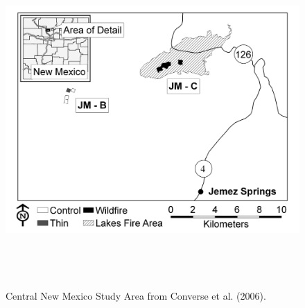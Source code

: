 \begin{figure}
\begin{center}
\includegraphics[height=5in,width=6.6in]{Ch13-Multisession/figs/converse_NM_Overview_4.jpg}
\end{center}
\caption{
Central New Mexico Study Area from Converse et al. (2006).
}
\label{fig.studyarea}
\end{figure}


\clearpage





